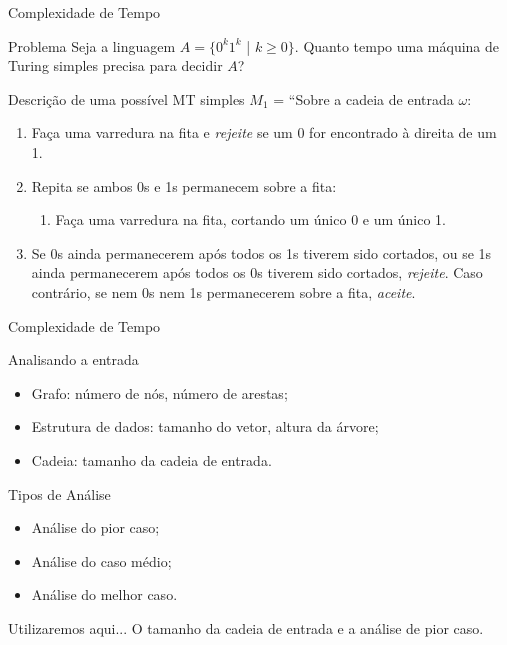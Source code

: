 \documentclass[xcolor=dvipsnames,table]{beamer}
\begin{document}
	\begin{frame}[shrink]{Complexidade de Tempo}
		\begin{block}{Problema}
			Seja a linguagem $A = \{ 0^k 1^k$ | $k \geq 0 \}$. Quanto tempo uma máquina de Turing simples precisa para decidir $A$?
		\end{block} \pause
		\begin{block}{Descrição de uma possível MT simples}
			$M_1$ = ``Sobre a cadeia de entrada $\omega$:
			\begin{enumerate}
				\item Faça uma varredura na fita e {\it rejeite} se um 0 for encontrado à direita de um 1.
				\item Repita se ambos 0s e 1s permanecem sobre a fita:
				\begin{enumerate}
					\item Faça uma varredura na fita, cortando um único 0 e um único 1.
				\end{enumerate}
				\item Se 0s ainda permanecerem após todos os 1s tiverem sido cortados, ou se 1s ainda permanecerem após todos os 0s tiverem sido cortados, {\it rejeite}. Caso contrário, se nem 0s nem 1s permanecerem sobre a fita, {\it aceite}.
			\end{enumerate}
		\end{block}
	\end{frame}
	
	\begin{frame}{Complexidade de Tempo}
		\begin{block}{Analisando a entrada}
			\begin{itemize}
				\item Grafo: número de nós, número de arestas;
				\item Estrutura de dados: tamanho do vetor, altura da árvore;
				\item Cadeia: tamanho da cadeia de entrada.
			\end{itemize}
		\end{block} \pause
		\begin{block}{Tipos de Análise}
			\begin{itemize}
				\item Análise do pior caso;
				\item Análise do caso médio;
				\item Análise do melhor caso.
			\end{itemize}
		\end{block} \pause
		\begin{block}{Utilizaremos aqui...}
			O tamanho da cadeia de entrada e a análise de pior caso.
		\end{block}
	\end{frame}
	
\end{document}
